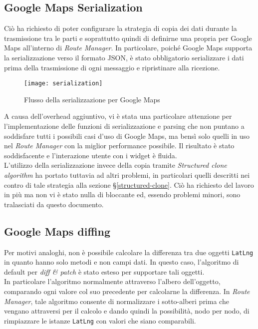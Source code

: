 \subsection{Google Maps Serialization}

Ciò ha richiesto di poter configurare la strategia di copia dei dati durante la trasmissione tra le parti e soprattutto quindi di definirne una propria per Google Maps all'interno di \textit{Route Manager}. In particolare, poiché Google Maps supporta la serializzazione verso il formato JSON, è stato obbligatorio serializzare i dati prima della trasmissione di ogni messaggio e ripristinare alla ricezione.

\begin{figure}[H] 
  \centering 
  \texttt{[image: serialization]} 
  \caption{Flusso della serializzazione per Google Maps}
\end{figure}

A causa dell'overhead aggiuntivo, vi è stata una particolare attenzione per l'implementazione delle funzioni di serializzazione e parsing che non puntano a soddisfare tutti i possibili casi d'uso di Google Maps, ma bensì solo quelli in uso nel \textit{Route Manager} con la miglior performance possibile. Il risultato è stato soddisfacente e l'interazione utente con i widget è fluida. \\

L'utilizzo della serializzazione invece della copia tramite \textit{Structured clone algorithm} ha portato tuttavia ad altri problemi, in particolari quelli descritti nei contro di tale strategia alla sezione §\ref{structured-clone}. Ciò ha richiesto del lavoro in più ma non vi è stato nulla di bloccante ed, essendo problemi minori, sono tralasciati da questo documento.

\subsection{Google Maps diffing}

Per motivi analoghi, non è possibile calcolare la differenza tra due oggetti \texttt{LatLng} in quanto hanno solo metodi e non campi dati. In questo caso, l'algoritmo di default per \textit{diff \& patch} è stato esteso per supportare tali oggetti. \\

In particolare l'algoritmo normalmente attraverso l'albero dell'oggetto, comparando ogni valore col suo precedente per calcolarne la differenza. In \textit{Route Manager}, tale algoritmo consente di normalizzare i sotto-alberi prima che vengano attraversi per il calcolo e dando quindi la possibilità, nodo per nodo, di rimpiazzare le istanze \texttt{LatLng} con valori che siano comparabili. 

